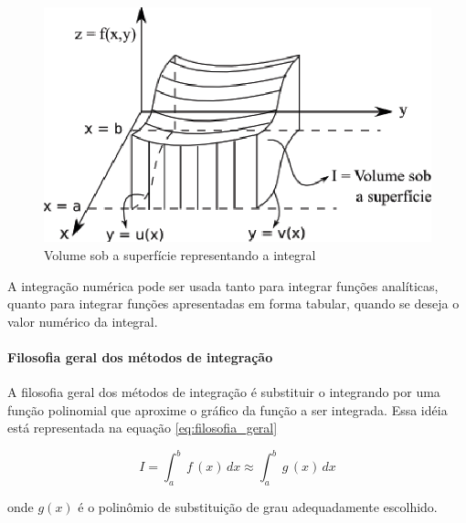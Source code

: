 \begin{figure}[htb]
 \centering
    \includegraphics[scale=0.8]{capitulos/capitulo2/figuras/intro2.eps}
    \caption{Volume sob a superfície representando a integral}
    \label{fig:intro2}
\end{figure}

A integra\c{c}\~ao num\'erica pode ser usada tanto para integrar fun\c{c}\~oes anal\'iticas, quanto para integrar fun\c{c}\~oes apresentadas em forma tabular, quando se deseja o valor num\'erico da integral.

\paragraph{Filosofia geral dos m\'etodos de integra\c{c}\~ao}

A filosofia geral dos m\'etodos de integra\c{c}\~ao \'e substituir o integrando por uma fun\c{c}\~ao polinomial que aproxime o gr\'afico da fun\c{c}\~ao a ser integrada. Essa id\'eia est\'a representada na equa\c{c}\~ao \ref{eq:filosofia_geral}

\begin{equation}
   I = \int_a^b \, f\,(x) \, dx \approx \int_a^b \, g\,(x) \, dx
   \label{eq:filosofia_geral}
\end{equation}

\noindent
onde $g(x)$ \'e o polin\^omio de substitui\c{c}\~ao de grau adequadamente escolhido.

